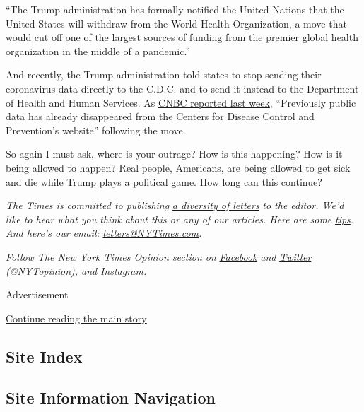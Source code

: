 ``The Trump administration has formally notified the United Nations that
the United States will withdraw from the World Health Organization, a
move that would cut off one of the largest sources of funding from the
premier global health organization in the middle of a pandemic.''

And recently, the Trump administration told states to stop sending their
coronavirus data directly to the C.D.C. and to send it instead to the
Department of Health and Human Services. As
\href{https://www.cnbc.com/2020/07/16/us-coronavirus-data-has-already-disappeared-after-trump-administration-shifted-control-from-cdc-to-hhs.html}{CNBC
reported last week}, ``Previously public data has already disappeared
from the Centers for Disease Control and Prevention's website''
following the move.

So again I must ask, where is your outrage? How is this happening? How
is it being allowed to happen? Real people, Americans, are being allowed
to get sick and die while Trump plays a political game. How long can
this continue?

\emph{The Times is committed to publishing}
\href{https://www.nytimes3xbfgragh.onion/2019/01/31/opinion/letters/letters-to-editor-new-york-times-women.html}{\emph{a
diversity of letters}} \emph{to the editor. We'd like to hear what you
think about this or any of our articles. Here are some}
\href{https://help.nytimes3xbfgragh.onion/hc/en-us/articles/115014925288-How-to-submit-a-letter-to-the-editor}{\emph{tips}}\emph{.
And here's our email:}
\href{mailto:letters@NYTimes.com}{\emph{letters@NYTimes.com}}\emph{.}

\emph{Follow The New York Times Opinion section on}
\href{https://www.facebookcorewwwi.onion/nytopinion}{\emph{Facebook}}
\emph{and} \href{http://twitter.com/NYTOpinion}{\emph{Twitter
(@NYTopinion)}}\emph{, and}
\href{https://www.instagram.com/nytopinion/}{\emph{Instagram}}\emph{.}

Advertisement

\protect\hyperlink{after-bottom}{Continue reading the main story}

\hypertarget{site-index}{%
\subsection{Site Index}\label{site-index}}

\hypertarget{site-information-navigation}{%
\subsection{Site Information
Navigation}\label{site-information-navigation}}

